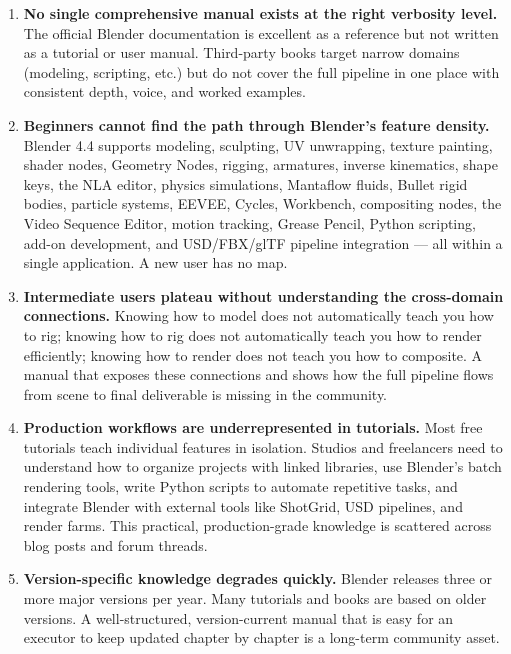 \documentclass[11pt,letterpaper]{article}
\begin{document}
\begin{enumerate}[leftmargin=2em]
  \item \textbf{No single comprehensive manual exists at the right verbosity level.} The official Blender documentation is excellent as a reference but not written as a tutorial or user manual. Third-party books target narrow domains (modeling, scripting, etc.) but do not cover the full pipeline in one place with consistent depth, voice, and worked examples.

  \item \textbf{Beginners cannot find the path through Blender's feature density.} Blender 4.4 supports modeling, sculpting, UV unwrapping, texture painting, shader nodes, Geometry Nodes, rigging, armatures, inverse kinematics, shape keys, the NLA editor, physics simulations, Mantaflow fluids, Bullet rigid bodies, particle systems, EEVEE, Cycles, Workbench, compositing nodes, the Video Sequence Editor, motion tracking, Grease Pencil, Python scripting, add-on development, and USD/FBX/glTF pipeline integration --- all within a single application. A new user has no map.

  \item \textbf{Intermediate users plateau without understanding the cross-domain connections.} Knowing how to model does not automatically teach you how to rig; knowing how to rig does not automatically teach you how to render efficiently; knowing how to render does not teach you how to composite. A manual that exposes these connections and shows how the full pipeline flows from scene to final deliverable is missing in the community.

  \item \textbf{Production workflows are underrepresented in tutorials.} Most free tutorials teach individual features in isolation. Studios and freelancers need to understand how to organize projects with linked libraries, use Blender's batch rendering tools, write Python scripts to automate repetitive tasks, and integrate Blender with external tools like ShotGrid, USD pipelines, and render farms. This practical, production-grade knowledge is scattered across blog posts and forum threads.

  \item \textbf{Version-specific knowledge degrades quickly.} Blender releases three or more major versions per year. Many tutorials and books are based on older versions. A well-structured, version-current manual that is easy for an executor to keep updated chapter by chapter is a long-term community asset.
\end{enumerate}
\end{document}
